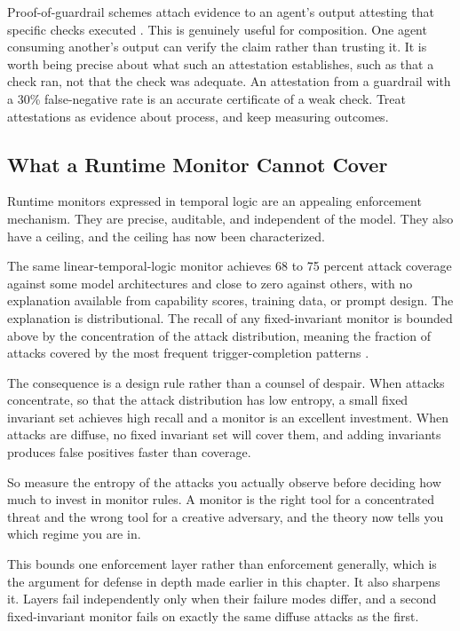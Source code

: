 Proof-of-guardrail schemes attach evidence to an agent's output attesting that
specific checks executed \cite{proofguardrail2026}. This is genuinely useful for
composition. One agent consuming another's output can verify the claim rather
than trusting it. It is worth being precise about what such an attestation
establishes, such as that a check ran, not that the check was adequate. An attestation
from a guardrail with a 30\% false-negative rate is an accurate certificate of a
weak check. Treat attestations as evidence about process, and keep measuring
outcomes.

\subsection{What a Runtime Monitor Cannot Cover}

Runtime monitors expressed in temporal logic are an appealing enforcement
mechanism. They are precise, auditable, and independent of the model. They also
have a ceiling, and the ceiling has now been characterized.

The same linear-temporal-logic monitor achieves 68 to 75 percent attack coverage
against some model architectures and close to zero against others, with no
explanation available from capability scores, training data, or prompt design.
The explanation is distributional. The recall of any fixed-invariant monitor is
bounded above by the concentration of the attack distribution, meaning the
fraction of attacks covered by the most frequent trigger-completion patterns
\cite{monitorbound2026}.

The consequence is a design rule rather than a counsel of despair. When attacks
concentrate, so that the attack distribution has low entropy, a small fixed
invariant set achieves high recall and a monitor is an excellent investment. When
attacks are diffuse, no fixed invariant set will cover them, and adding
invariants produces false positives faster than coverage.

So measure the entropy of the attacks you actually observe before deciding how
much to invest in monitor rules. A monitor is the right tool for a concentrated
threat and the wrong tool for a creative adversary, and the theory now tells you
which regime you are in.

This bounds one enforcement layer rather than enforcement generally, which is the
argument for defense in depth made earlier in this chapter. It also sharpens it.
Layers fail independently only when their failure modes differ, and a second
fixed-invariant monitor fails on exactly the same diffuse attacks as the first.

